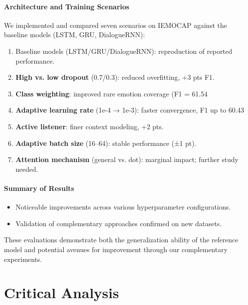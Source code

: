 \documentclass[a4paper,11pt]{article}
\begin{document}
\paragraph{Architecture and Training Scenarios}
We implemented and compared seven scenarios on IEMOCAP against the baseline models (LSTM, GRU, DialogueRNN):
\begin{enumerate}
  \item Baseline models (LSTM/GRU/DialogueRNN): reproduction of reported performance.
  \item \textbf{High vs. low dropout} (0.7/0.3): reduced overfitting, +3 pts F1.
  \item \textbf{Class weighting}: improved rare emotion coverage (F1 = 61.54 %
  \item \textbf{Adaptive learning rate} (1e-4 → 1e-3): faster convergence, F1 up to 60.43 %
  \item \textbf{Active listener}: finer context modeling, +2 pts.
  \item \textbf{Adaptive batch size} (16–64): stable performance (±1 pt).
  \item \textbf{Attention mechanism} (general vs. dot): marginal impact; further study needed.
\end{enumerate}

\paragraph{Summary of Results}
\begin{itemize}
  \item Noticeable improvements across various hyperparameter configurations.
  \item Validation of complementary approaches confirmed on new datasets.
\end{itemize}

These evaluations demonstrate both the generalization ability of the reference model and potential avenues for improvement through our complementary experiments.

\newpage

\section{Critical Analysis}
\end{document}
